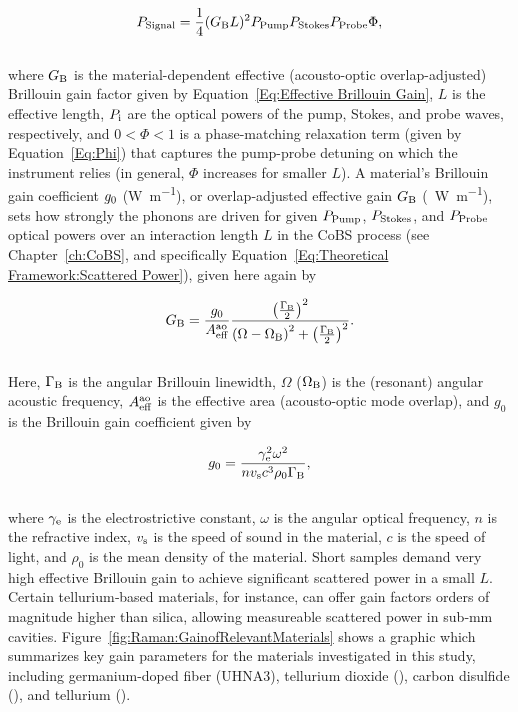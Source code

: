 \begin{equation}
  P_{\rm Signal} = \frac{1}{4}(G_{\rm B}L)^{2}P_{\rm Pump}P_{\rm Stokes}P_{\rm Probe}\Phi,
  \label{eq:Raman:ScatteredPowerPhi}
\end{equation}
\\
where \(G_{\rm B}\) is the material-dependent effective (acousto-optic overlap-adjusted) Brillouin gain factor given by Equation~\ref{Eq:Effective Brillouin Gain}, \(L\) is the effective length, \(P_{\rm i}\) are the optical powers of the pump, Stokes, and probe waves, respectively, and \(0 < \Phi < 1\) is a phase-matching relaxation term (given by Equation~\ref{Eq:Phi}) that captures the pump-probe detuning on which the instrument relies (in general, \(\Phi\) increases for smaller \(L\)). A material’s Brillouin gain coefficient \(g_{\rm 0}\) (\si{\watt\per\meter}), or overlap‐adjusted effective gain \(G_{\rm B}\) (\si{\per\watt\per\meter}), sets how strongly the phonons are driven for given \(P_{\rm Pump}\), \(P_{\rm Stokes}\), and \(P_{\rm Probe}\) optical powers over an interaction length \(L\) in the \ac{CoBS} process (see Chapter~\ref{ch:CoBS}, and specifically Equation~\ref{Eq:Theoretical Framework:Scattered Power}), given here again by

\begin{equation}
  G_{\rm B} = \frac{g_{0}}{A_{\rm eff}^{\rm ao}}\frac{\left(\frac{\Gamma_{\rm B}}{2}\right)^{2}}{\left(\Omega - \Omega_{\rm B}\right)^{2} + \left(\frac{\Gamma_{\rm B}}{2}\right)^{2}}.
  \label{eq:Raman:GB}
\end{equation}
\\
Here, \(\Gamma_{\rm B}\) is the angular Brillouin linewidth, \(\Omega\) (\(\Omega_{\rm B}\)) is the (resonant) angular acoustic frequency, \(A_{\rm eff}^{\rm ao}\) is the effective area (acousto-optic mode overlap), and \(g_{0}\) is the Brillouin gain coefficient given by

\begin{equation}
  g_{0} = \frac{\gamma_{\rm e}^{2}\omega^{2}}{nv_{\rm s}c^{3}\rho_{0}\Gamma_{\rm B}},
  \label{eq:Raman:g0}
\end{equation}
\\
where \(\gamma_{\rm e}\) is the electrostrictive constant, \(\omega\) is the angular optical frequency, \(n\) is the refractive index, \(v_{\rm s}\) is the speed of sound in the material, \(c\) is the speed of light, and \(\rho_{0}\) is the mean density of the material. Short samples demand very high effective Brillouin gain to achieve significant scattered power in a small \(L\). Certain tellurium‐based materials, for instance, can offer gain factors orders of magnitude higher than silica, \cite{sanghera2010nonlinear, abedin2005observation} allowing measureable scattered power in sub‐\si{\milli\meter} cavities. Figure~\ref{fig:Raman:GainofRelevantMaterials} shows a graphic which summarizes key gain parameters for the materials investigated in this study, including germanium-doped fiber (\acs{UHNA3}), tellurium dioxide (), carbon disulfide (), and tellurium ().

